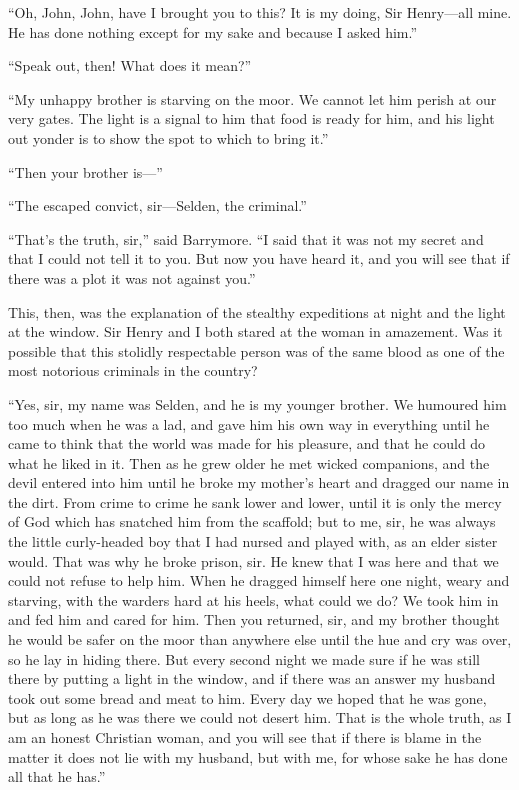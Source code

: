 \documentclass[paper=a5,BCOR=7mm,twoside,DIV=calc,12pt,usegeometry,openany,chapterprefix,endperiod,headings=big]{scrbook} %
\begin{document}
\enquote{Oh, John, John, have I brought you to this? It is my doing, Sir Henry---all mine. He has done nothing except for my sake and because I asked him.}

\enquote{Speak out, then! What does it mean?}

\enquote{My unhappy brother is starving on the moor. We cannot let him perish at our very gates. The light is a signal to him that food is ready for him, and his light out yonder is to show the spot to which to bring it.}

\enquote{Then your brother is---}

\enquote{The escaped convict, sir---Selden, the criminal.}

\enquote{That's the truth, sir,} said Barrymore. \enquote{I said that it was not my secret and that I could not tell it to you. But now you have heard it, and you will see that if there was a plot it was not against you.}
%


This, then, was the explanation of the stealthy expeditions at night and the light at the window. Sir Henry and I both stared at the woman in amazement. Was it possible that this stolidly respectable person was of the same blood as one of the most notorious criminals in the country?

\enquote{Yes, sir, my name was Selden, and he is my younger brother. We humoured him too much when he was a lad, and gave him his own way in everything until he came to think that the world was made for his pleasure, and that he could do what he liked in it. Then as he grew older he met wicked companions, and the devil entered into him until he broke my mother's heart and dragged our name in the dirt. From crime to crime he sank lower and lower, until it is only the mercy of God which has snatched him from the scaffold; but to me, sir, he was always the little curly-headed boy that I had nursed and played with, as an elder sister would. That was why he broke prison, sir. He knew that I was here and that we could not refuse to help him. When he dragged himself here one night, weary and starving, with the warders hard at his heels, what could we do? We took him in and fed him and cared for him. Then you returned, sir, and my brother thought he would be safer on the moor than anywhere else until the hue and cry was over, so he lay in hiding there. But every second night we made sure if he was still there by putting a light in the window, and if there was an answer my husband took out some bread and meat to him. Every day we hoped that he was gone, but as long as he was there we could not desert him. That is the whole truth, as I am an honest Christian woman, and you will see that if there is blame in the matter it does not lie with my husband, but with me, for whose sake he has done all that he has.}
\end{document}
